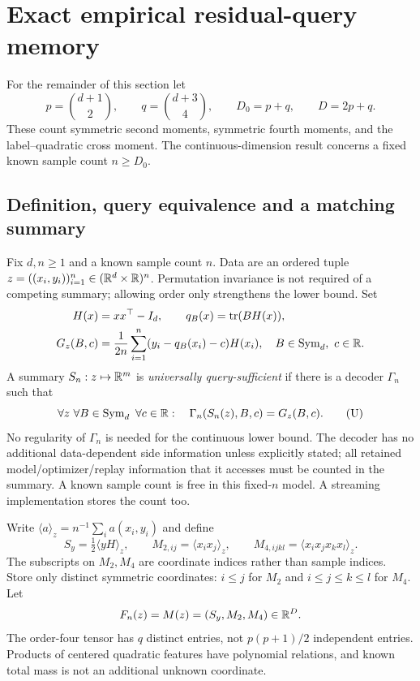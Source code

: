 \section{Exact empirical residual-query memory}
\label{sec:memory}
For the remainder of this section let
\[
 p=\binom{d+1}{2},\qquad q=\binom{d+3}{4},\qquad
 D_0=p+q,\qquad D=2p+q.
\]
These count symmetric second moments, symmetric fourth moments,
and the label--quadratic cross moment. The continuous-dimension
result concerns a fixed known sample count $n\ge D_0$.
\subsection{Definition, query equivalence and a matching summary}

Fix $d,n\ge1$ and a known sample count $n$.  Data are an ordered tuple
$z=((x_i,y_i))_{i=1}^n\in(\mathbb R^d\times\mathbb R)^n$.  Permutation invariance is
not required of a competing summary; allowing order only strengthens the
lower bound. Set
\begin{align*}
 H(x)&=xx^\top-I_d,\qquad q_B(x)=\operatorname{tr}(BH(x)),\\
 G_z(B,c)&=\frac1{2n}\sum_{i=1}^n
       (y_i-q_B(x_i)-c)H(x_i),\quad B\in\operatorname{Sym}_d,\ c\in\mathbb R.
\end{align*}
A summary $S_n:z\mapsto\mathbb R^m$ is \emph{universally query-sufficient} if
there is a decoder $\Gamma_n$ such that
\[
 \forall z\ \forall B\in\Sym_d\ \forall c\in\R:
 \quad \Gamma_n(S_n(z),B,c)=G_z(B,c).
 \tag{U}
\]
No regularity of $\Gamma_n$ is needed for the continuous lower bound.
The decoder has no additional data-dependent side information unless
explicitly stated; all retained model/optimizer/replay information that
it accesses must be counted in the summary. A known sample count is free
in this fixed-$n$ model. A streaming implementation stores the count too.

Write $\langle a\rangle_z=n^{-1}\sum_i a(x_i,y_i)$ and define
\[
 S_y=\tfrac12\langle yH\rangle_z,\qquad
 M_{2,ij}=\langle x_ix_j\rangle_z,\qquad
 M_{4,ijkl}=\langle x_ix_jx_kx_l\rangle_z.
\]
The subscripts on $M_2,M_4$ are coordinate indices rather than sample
indices. Store only distinct symmetric coordinates: $i\le j$ for $M_2$
and $i\le j\le k\le l$ for $M_4$. Let
\[
 F_n(z)=M(z)=(S_y,M_2,M_4)\in\mathbb R^D.
\]
The order-four tensor has $q$ distinct entries, not $p(p+1)/2$ independent
entries. Products of centered quadratic features have polynomial
relations, and known total mass is not an additional unknown coordinate.

